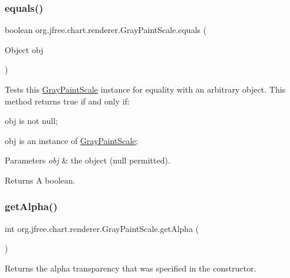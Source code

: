 \subsubsection{\texorpdfstring{equals()}{equals()}}
{\footnotesize\ttfamily boolean org.\+jfree.\+chart.\+renderer.\+Gray\+Paint\+Scale.\+equals (\begin{DoxyParamCaption}\item[{Object}]{obj }\end{DoxyParamCaption})}

Tests this {\ttfamily \mbox{\hyperlink{classorg_1_1jfree_1_1chart_1_1renderer_1_1_gray_paint_scale}{Gray\+Paint\+Scale}}} instance for equality with an arbitrary object. This method returns {\ttfamily true} if and only if\+: 
\begin{DoxyItemize}
\item {\ttfamily obj} is not {\ttfamily null}; 
\item {\ttfamily obj} is an instance of {\ttfamily \mbox{\hyperlink{classorg_1_1jfree_1_1chart_1_1renderer_1_1_gray_paint_scale}{Gray\+Paint\+Scale}}}; 
\end{DoxyItemize}


\begin{DoxyParams}{Parameters}
{\em obj} & the object ({\ttfamily null} permitted).\\
\hline
\end{DoxyParams}
\begin{DoxyReturn}{Returns}
A boolean. 
\end{DoxyReturn}
\mbox{\label{classorg_1_1jfree_1_1chart_1_1renderer_1_1_gray_paint_scale_a7e67a017f30b8287b6664647ee433ef4}} 
\subsubsection{\texorpdfstring{get\+Alpha()}{getAlpha()}}
{\footnotesize\ttfamily int org.\+jfree.\+chart.\+renderer.\+Gray\+Paint\+Scale.\+get\+Alpha (\begin{DoxyParamCaption}{ }\end{DoxyParamCaption})}

Returns the alpha transparency that was specified in the constructor.

